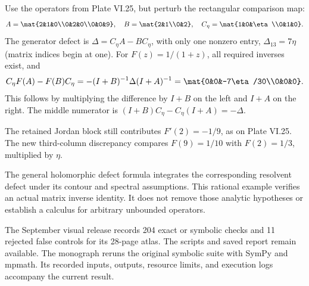 Use the operators from Plate VI.25, but perturb the rectangular comparison map:
\[
A=\mat{2&1&0\\0&2&0\\0&0&9},\quad
B=\mat{2&1\\0&2},\quad
C_\eta=\mat{1&0&\eta\\0&1&0}.
\]
The generator defect is $\Delta=C_\eta A-BC_\eta$, with only one nonzero entry, $\Delta_{13}=7\eta$ (matrix indices begin at one).
For $F(z)=1/(1+z)$, all required inverses exist, and
\[
C_\eta F(A)-F(B)C_\eta
=-(I+B)^{-1}\Delta(I+A)^{-1}
=\mat{0&0&-7\eta/30\\0&0&0}.
\]
This follows by multiplying the difference by $I+B$ on the left and $I+A$ on the right. The middle numerator is $(I+B)C_\eta-C_\eta(I+A)=-\Delta$.

The retained Jordan block still contributes $F'(2)=-1/9$, as on Plate VI.25. The new third-column discrepancy compares $F(9)=1/10$ with $F(2)=1/3$, multiplied by $\eta$.

The general holomorphic defect formula integrates the corresponding resolvent defect under its contour and spectral assumptions. This rational example verifies an actual matrix inverse identity. It does not remove those analytic hypotheses or establish a calculus for arbitrary unbounded operators.

The September visual release records 204 exact or symbolic checks and 11 rejected false controls for its 28-page atlas. The scripts and saved report remain available. The monograph reruns the original symbolic suite with SymPy and mpmath. Its recorded inputs, outputs, resource limits, and execution logs accompany the current result.

